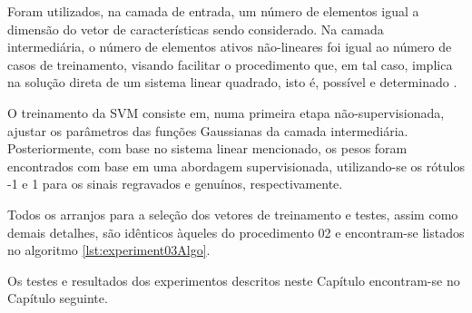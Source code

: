 		\par Foram utilizados, na camada de entrada, um número de elementos igual a dimensão do vetor de características sendo considerado. Na camada intermediária, o número de elementos ativos não-lineares foi igual ao número de casos de treinamento, visando facilitar o procedimento que, em tal caso, implica na solução direta de um sistema linear quadrado, isto é, possível e determinado \cite{poole2014linear}. 
		
		\par O treinamento da SVM consiste em, numa primeira etapa não-supervisionada, ajustar os parâmetros das funções Gaussianas da camada intermediária. Posteriormente, com base no sistema linear mencionado, os pesos foram encontrados com base em uma abordagem supervisionada, utilizando-se os rótulos -1 e 1 para os sinais regravados e genuínos, respectivamente.    
		
		\par Todos os arranjos para a seleção dos vetores de treinamento e testes, assim como demais detalhes,   são idênticos àqueles do procedimento 02 e encontram-se listados no algoritmo \ref{lst:experiment03Algo}. 
		
		

        \par Os testes e resultados dos experimentos descritos neste Capítulo encontram-se no Capítulo seguinte. 